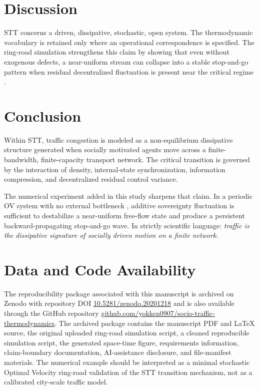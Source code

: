 \documentclass[11pt]{article}
\begin{document}
\section{Discussion}
STT concerns a driven, dissipative, stochastic, open system. The thermodynamic vocabulary is retained only where an operational correspondence is specified. The ring-road simulation strengthens this claim by showing that even without exogenous defects, a near-uniform stream can collapse into a stable stop-and-go pattern when residual decentralized fluctuation is present near the critical regime \cite{Sugiyama2008}.

\section{Conclusion}
Within STT, traffic congestion is modeled as a non-equilibrium dissipative structure generated when socially motivated agents move across a finite-bandwidth, finite-capacity transport network. The critical transition is governed by the interaction of density, internal-state synchronization, information compression, and decentralized residual control variance.

The numerical experiment added in this study sharpens that claim. In a periodic OV system with no external bottleneck \cite{Bando1995, Sugiyama2008}, additive sovereignty fluctuation is sufficient to destabilize a near-uniform free-flow state and produce a persistent backward-propagating stop-and-go wave. In strictly scientific language: \emph{traffic is the dissipative signature of socially driven motion on a finite network.}


\section*{Data and Code Availability}
The reproducibility package associated with this manuscript is archived on Zenodo with repository DOI \href{https://doi.org/10.5281/zenodo.20201218}{10.5281/zenodo.20201218} and is also available through the GitHub repository \href{https://github.com/yokken0907/socio-traffic-thermodynamics}{github.com/yokken0907/socio-traffic-thermodynamics}. The archived package contains the manuscript PDF and \LaTeX{} source, the original uploaded ring-road simulation script, a cleaned reproducible simulation script, the generated space-time figure, requirements information, claim-boundary documentation, AI-assistance disclosure, and file-manifest materials. The numerical example should be interpreted as a minimal stochastic Optimal Velocity ring-road validation of the STT transition mechanism, not as a calibrated city-scale traffic model.
\end{document}
